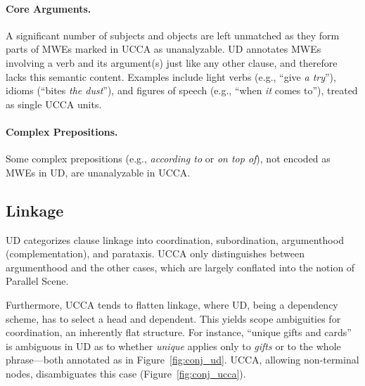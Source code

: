 \documentclass[11pt,a4paper]{article}
\begin{document}
\paragraph{Core Arguments.}
      A significant number of subjects and objects are left unmatched as they
      form parts of MWEs marked in UCCA as unanalyzable. UD annotates
      MWEs involving a verb and its argument(s) just like any other clause, and therefore
      lacks this semantic content. Examples include light verbs (e.g., ``give {\it a try}''),
      idioms (``bites {\it the dust}''), and figures of speech (e.g., ``when \textit{it} comes to''),
      treated as single UCCA units.
      
\paragraph{Complex Prepositions.} Some complex prepositions (e.g., \textit{according to} or \textit{on top of}),
      not encoded as MWEs in UD, are unanalyzable in UCCA.


\subsection{Linkage}\label{sec:linkage}

UD categorizes clause linkage into coordination,
subordination, argumenthood (complementation),
and parataxis. %
UCCA only distinguishes between argumenthood 
and the other cases, which are largely conflated into the notion
of Parallel Scene.

Furthermore, UCCA tends to flatten linkage, where UD, being a dependency scheme,
has to select a head and dependent.
This yields scope ambiguities for coordination, an inherently flat structure. 
For instance, ``unique gifts and cards'' is ambiguous in UD as to whether
\textit{unique} applies only to \textit{gifts} or to the whole phrase---both
annotated as in Figure~\ref{fig:conj_ud}.
UCCA, allowing non-terminal nodes, disambiguates this case (Figure~\ref{fig:conj_ucca}).

\end{document}
